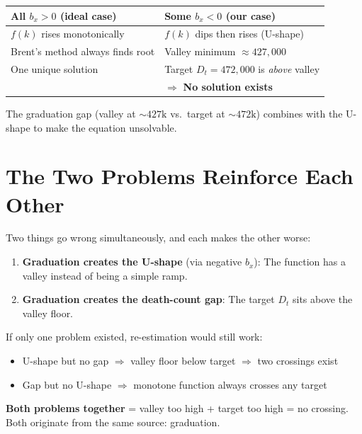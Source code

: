 \documentclass[11pt, a4paper]{article}
\newcommand{\bx}{b_x}
\begin{document}
\begin{application}

\begin{center}
\renewcommand{\arraystretch}{1.1}
\begin{tabular}{p{6cm}p{6cm}}
\toprule
\textbf{All $\bx > 0$ (ideal case)} & \textbf{Some $\bx < 0$ (our case)} \\
\midrule
$f(k)$ rises monotonically &
$f(k)$ dips then rises (U-shape) \\[0.3em]
Brent's method always finds root &
Valley minimum $\approx 427{,}000$ \\[0.3em]
One unique solution &
Target $D_t = 472{,}000$ is \emph{above} valley \\[0.3em]
 &
$\Rightarrow$ \textbf{No solution exists} \\
\bottomrule
\end{tabular}
\end{center}

The graduation gap (valley at ${\sim}427\text{k}$ vs.\ target at
${\sim}472\text{k}$) combines with the U-shape to make the equation
unsolvable.
\end{application}


\section{The Two Problems Reinforce Each Other}

\begin{intuition}
Two things go wrong simultaneously, and each makes the other worse:

\begin{enumerate}[nosep]
\item \textbf{Graduation creates the U-shape} (via negative $\bx$):
  The function has a valley instead of being a simple ramp.
\item \textbf{Graduation creates the death-count gap}:
  The target $D_t$ sits above the valley floor.
\end{enumerate}

If only one problem existed, re-estimation would still work:
\begin{itemize}[nosep]
\item U-shape but no gap $\Rightarrow$ valley floor below target $\Rightarrow$ two crossings exist
\item Gap but no U-shape $\Rightarrow$ monotone function always crosses any target
\end{itemize}

\textbf{Both problems together} = valley too high + target too high = no crossing.
Both originate from the same source: graduation.
\end{intuition}
\end{document}
